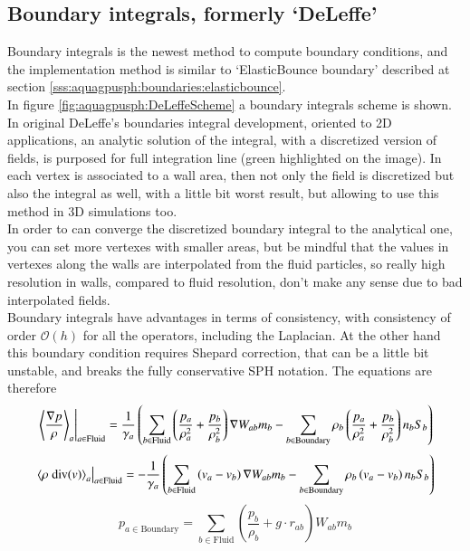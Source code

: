 \subsection{Boundary integrals, formerly `DeLeffe'}
\label{sss:aquagpusph:boundaries:DeLeffe}
%
Boundary integrals is the newest method to compute boundary conditions, and the implementation method is similar
to `ElasticBounce boundary' described at section \ref{sss:aquagpusph:boundaries:elasticbounce}.\\
%
In figure \ref{fig:aquagpusph:DeLeffeScheme} a boundary integrals scheme is shown. In original DeLeffe's boundaries
integral development, oriented to 2D applications, an analytic solution of the integral, with a discretized
version of fields, is purposed for full integration line (green highlighted on the image). In \NAME each vertex
is associated to a wall area, then not only the field is discretized but also the integral as well, with a little
bit worst result, but allowing to use this method in 3D simulations too.\\
%
In order to can converge the discretized boundary integral to the analytical one, you can set more vertexes with
smaller areas, but be mindful that the values in vertexes along the walls are interpolated from the fluid particles,
so really high resolution in walls, compared to fluid resolution, don't make any sense due to bad interpolated
fields.\\
%
Boundary integrals have advantages in terms of consistency, with consistency of order $\mathcal{O}(h)$ for all the
operators, including the Laplacian. At the other hand this boundary condition requires Shepard correction, that
can be a little bit unstable, and breaks the fully conservative SPH notation. The equations are therefore
%
\[
\left. \left\langle \frac{\nabla p}{\rho} \right\rangle_a \right\vert_{a \in \mathrm{Fluid}} =
	\frac{1}{\gamma_a} \left(
		\sum\limits_{b \in \mathrm{Fluid}} 
			\left( \frac{p_a}{\rho_a^2} + \frac{p_b}{\rho_b^2} \right)
		\nabla W_{ab} m_b
		- \sum\limits_{b \in \mathrm{Boundary}}
			\rho_b \left( \frac{p_a}{\rho_a^2} + \frac{p_b}{\rho_b^2} \right)
		n_b S_b
	\right)
\]
\[
\left. \left\langle \rho \; \mbox{div}(v) \right\rangle_a \right\vert_{a \in \mathrm{Fluid}} =
	- \frac{1}{\gamma_a} \left(
		\sum\limits_{b \in \mathrm{Fluid}} 
			\left( v_a - v_b \right)
		\nabla W_{ab} m_b
		- \sum\limits_{b \in \mathrm{Boundary}}
			\rho_b \left( v_a - v_b \right)
		n_b S_b
	\right)
\]
\[
p_{a \in \mathrm{Boundary}} = \sum\limits_{b \in \mathrm{Fluid}}
	\left( \frac{p_b}{\rho_b} + g \cdot r_{ab}\right )
	W_{ab} m_b
\]
